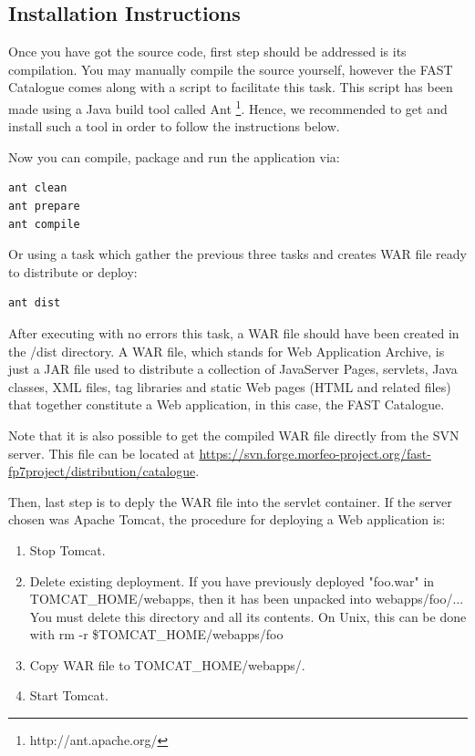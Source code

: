 \documentclass{fast_latex}
\begin{document}
\subsection{Installation Instructions} %
\label{sub:installation_instructions}

Once you have got the source code, first step should be addressed is its compilation. You may manually compile the source yourself, however the FAST Catalogue comes along with a script to facilitate this task. This script has been made using a Java build tool called Ant \footnote{http://ant.apache.org/}. Hence, we recommended to get and install such a tool in order to follow the instructions below.

Now you can compile, package and run the application via:
\begin{verbatim}
ant clean
ant prepare
ant compile
\end{verbatim}

Or using a task which gather the previous three tasks and creates WAR file ready to distribute or deploy:
\begin{verbatim}
ant dist
\end{verbatim}

After executing with no errors this task, a WAR file should have been created in the /dist directory. A WAR file, which stands for  Web Application Archive, is just a JAR file used to distribute a collection of JavaServer Pages, servlets, Java classes, XML files, tag libraries and static Web pages (HTML and related files) that together constitute a Web application, in this case, the FAST Catalogue.

Note that it is also possible to get the compiled WAR file directly from the SVN server. This file can be located at \url{https://svn.forge.morfeo-project.org/fast-fp7project/distribution/catalogue}.

Then, last step is to deply the WAR file into the servlet container. If the server chosen was Apache Tomcat, the procedure for deploying a Web application is:
\begin{enumerate}
	\item Stop Tomcat.
	\item Delete existing deployment. If you have previously deployed "foo.war" in TOMCAT\_HOME/webapps, then it has been unpacked into webapps/foo/... You must delete this directory and all its contents. On Unix, this can be done with
rm -r \$TOMCAT\_HOME/webapps/foo
	\item Copy WAR file to TOMCAT\_HOME/webapps/.
	\item Start Tomcat.
\end{enumerate}
\end{document}
